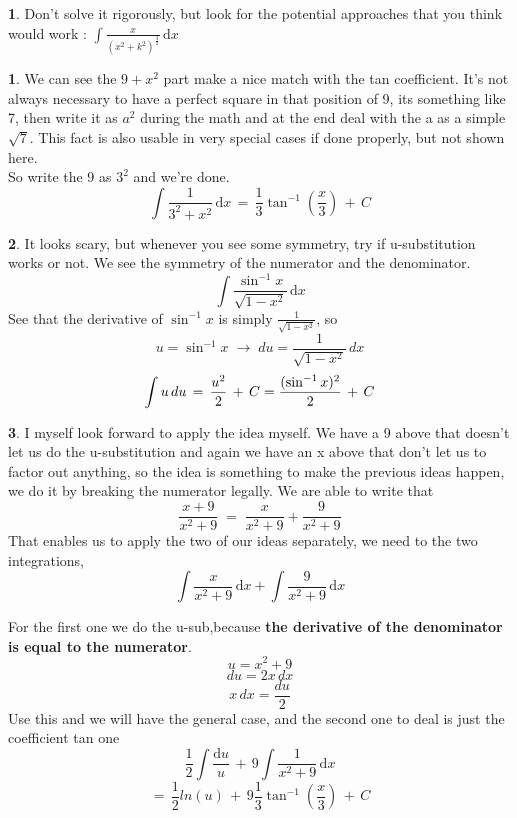 \documentclass[11pt,a4paper,twocolumn]{article}
\theoremstyle{definition}
\theoremstyle{definition}
\newtheorem{pr}{ \framebox[0.05\textwidth]{Pr} }
\theoremstyle{definition}
\theoremstyle{definition}
\newtheorem{sol}{ \framebox[0.05\textwidth]{Sol} }
\begin{document}
		\begin{pr}
Don't solve it rigorously, but look for the potential approaches that you think would work : $ \int \frac{x}
                                                                                                                                                                {	( x^2 + k^2) ^ {\frac{3}{2}} } \, \mathrm{d}x $
                                                                                                                                                                \end{pr}

\begin{sol}
We can see the $9 + x^2$ part make a nice match with the tan coefficient. It's not always necessary to have a perfect square in that position of 9, its something like 7, then write it as $a^2$ during the math and at the end deal with the a as a simple $\sqrt{7}$. This fact is also usable in very special cases if done properly, but not shown here.\\
So write the 9 as $3^2$ and we're done.
\[ \int \frac{1}{3^{2} + x^2} \, \mathrm{d} x \, = \, \frac{1}{3} \tan ^{-1}
 																									 (\frac{x}{3}) \, + \, C \]

\end{sol}

\begin{sol}
It looks scary, but whenever you see some symmetry, try if u-substitution works or not. We see the symmetry of the numerator and the denominator. 
\[ 
 \int \frac{\sin ^{-1}x}{\sqrt{1 - x^2}} \, \mathrm{d} x 
 \]
See that the derivative of $\sin^{-1} x$ is simply $\frac{1}{\sqrt{  1 - x^2      }}$, so
\[ u = \sin^{-1} x	\; \rightarrow \; du = \frac{1}{\sqrt{  1 - x^2      }} \, dx \]
\[\int u\, du \, = \, \frac{u^2}{2} \,+\, C \\
= \frac{(\sin ^{-1}x)^2}{2} \,+\, C\]
\end{sol}

\begin{sol}
I myself look forward to apply the idea myself. We have a 9 above that doesn't let us do the u-substitution and again we have an x above that don't let us to factor out anything, so the idea is something to make the previous ideas happen, we do it by breaking the numerator legally. We are able to write that
\[		\frac{x + 9}{x^{2} + 9}
		\;
		=
		\;
		\frac{x}{x^{2} + 9} 	+ 		\frac{9}{x^{2} + 9}
\]
That enables us to apply the two of our ideas separately, we need to the two integrations,
\[			\int	\frac{x}{x^{2} + 9} \, \mathrm{d} x	+
			\int	\frac{9}{x^{2} + 9} \, \mathrm{d}x  \]

For the first one we do the u-sub,because\textbf{ the derivative of the denominator is equal to the numerator}. 
\[ u = x^{2} + 9 \]
\[ du = 2x \, dx \]
\[ x \, dx = \frac{du}{2}
\]
Use this and we will have the general case, and the second one to deal is just the coefficient tan one
\[ \frac{1}{2}	\int	\frac{\mathrm{d}u }{u}
			\, + \,
	9 \int \frac{1}{ x^{2} + 9}\, \mathrm{d} x
    \]
    \[ = \, \frac{1}{2} ln(u) \, + \, 9\frac{1}{3} \tan ^{-1} (\frac{x}{3})\, +\, C	
\]
\end{sol}
\end{document}
